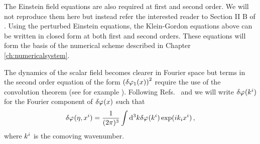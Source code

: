 The Einstein field equations are also required at first and second order. We
will not reproduce them here but instead refer the interested reader to Section
II B of .
Using the perturbed Einstein equations, the Klein-Gordon equations above can be
written in closed form at both first and second orders. These equations will
form the basis of the numerical scheme described in Chapter \ref{ch:numericalsystem}.


The dynamics of the scalar field becomes clearer in Fourier space but terms in
the second order equation of the form $\left(\delta\varphi_{1}(x)\right)^2$ require the use
of the convolution theorem (see for example ).
Following Refs.~\cite{Malik:2006ir} and \cite{book:liddle} we will write
$\delta\varphi_{}(k^i)$
for the Fourier component of $\delta\varphi_{}(x)$ such that
% 
\begin{equation}
 \delta\varphi_{}(\eta, x^i) = \frac{1}{(2 \pi)^3} \int \mathrm{d}^3k \delta\varphi_{}(k^i) \exp (i k_i
x^i)
\,,
\end{equation}
% 
where $k^i$ is the comoving wavenumber.


